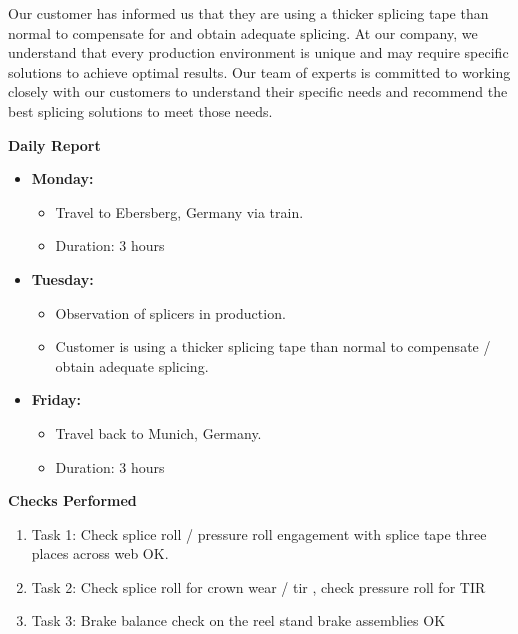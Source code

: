 \documentclass{article}
\begin{document}
\vspace{0.5em}
Our customer has informed us that they are using a thicker splicing tape than normal to compensate for and obtain adequate splicing. At our company, we understand that every production environment is unique and may require specific solutions to achieve optimal results. Our team of experts is committed to working closely with our customers to understand their specific needs and recommend the best splicing solutions to meet those needs. 

\vspace{0.25em}

\begin{center}
    \textbf{Daily Report}
\end{center}

\vspace{0.25em}

\begin{itemize}
    \item \textbf{Monday:}
    \begin{itemize}
        \item Travel to Ebersberg, Germany via train.
        \item Duration: 3 hours
    \end{itemize}
    
    \item \textbf{Tuesday:}
    \begin{itemize}
        \item Observation of splicers in production.
        \item Customer is using a thicker splicing tape than normal to compensate / obtain adequate splicing.
    \end{itemize}
    \item \textbf{Friday:}
    \begin{itemize}
        \item Travel back to Munich, Germany.
        \item Duration: 3 hours
    \end{itemize}
\end{itemize}

\vspace{0.25em}

\begin{center}
    \textbf{Checks Performed}
\end{center}

\vspace{0.25em}

\begin{enumerate}
    \item Task 1: Check splice roll / pressure roll engagement with splice tape three places across web OK.
    \item Task 2: Check splice roll for crown wear / tir , check pressure roll for TIR
    \item Task 3: Brake balance check on the reel stand brake assemblies OK

\end{enumerate}
\end{document}
